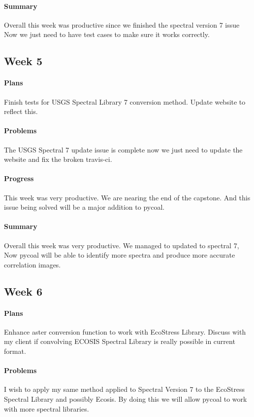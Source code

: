 \documentclass{article}
\begin{document}
\paragraph{Summary}
Overall this week was productive since we finished the spectral version 7 issue
Now we just need to have test cases to make sure it works correctly. 
\subsection{Week 5}
\paragraph{Plans}
Finish tests for USGS Spectral Library 7 conversion method. Update website to reflect this. 
\paragraph{Problems}
The USGS Spectral 7 update issue is complete now we just need to update the website and fix the broken travis-ci.
\paragraph{Progress}
This week was very productive. We are nearing the end of the capstone. And this issue being solved will be a major addition to pycoal.
\paragraph{Summary}
Overall this week was very productive. We managed to updated to spectral 7, Now pycoal will be able to identify more spectra and produce more accurate correlation images.
\subsection{Week 6}
\paragraph{Plans}
Enhance aster conversion function to work with EcoStress Library. Discuss with my client if convolving ECOSIS Spectral Library is really possible in current format.
\paragraph{Problems}
I wish to apply my same method applied to Spectral Version 7 to the EcoStress Spectral Library and possibly Ecosis. By doing this we will allow pycoal to work with more spectral libraries. 
\end{document}
